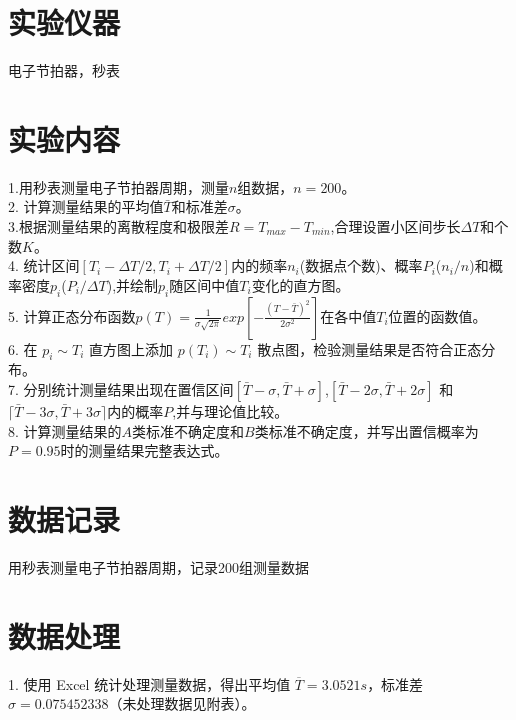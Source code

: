 \documentclass[12pt,a4paper]{article}
\begin{document}
	\section{实验仪器}
	电子节拍器，秒表

	\section{实验内容}
	1.用秒表测量电子节拍器周期，测量$n$组数据，$n=200$。
	\\2. 计算测量结果的平均值$\bar{T}$和标准差$\sigma$。
	\\3.根据测量结果的离散程度和极限差$R=T_{max}-T_{min}$,合理设置小区间步长$\Delta T$和个数$K$。
	\\4. 统计区间$[T_i-\Delta T/2,T_i+\Delta T/2]$内的频率$n_i$(数据点个数)、概率$P_i$($n_i/n$)和概率密度$p_i$($P_i/\Delta T$),并绘制$p_i$随区间中值$T_i$变化的直方图。
	\\5. 计算正态分布函数$p(T)=\frac1{\sigma\sqrt{2\pi}}exp[-\frac{(T-\bar{T})^2}{2\sigma^2}]$在各中值$T_i$位置的函数值。
	\\6. 在 $p_i \sim T_i$ 直方图上添加 $p(T_i) \sim T_i$ 散点图，检验测量结果是否符合正态分布。
	\\7. 分别统计测量结果出现在置信区间$[\bar{T}-\sigma,\bar{T}+\sigma]$,$[\bar{T}-2\sigma,\bar{T}+2\sigma]$ 和$\lceil\bar{T}-3\sigma,\bar{T}+3\sigma\rceil$内的概率$P$,并与理论值比较。
	\\8. 计算测量结果的$A$类标准不确定度和$B$类标准不确定度，并写出置信概率为$P=0.95$时的测量结果完整表达式。
	
	\section{数据记录}
	用秒表测量电子节拍器周期，记录200组测量数据

	\section{数据处理}
	1. 使用 Excel 统计处理测量数据，得出平均值 $\overline{T}=3.0521s$，标准差 $\sigma=0.075452338$（未处理数据见附表）。
\end{document}
